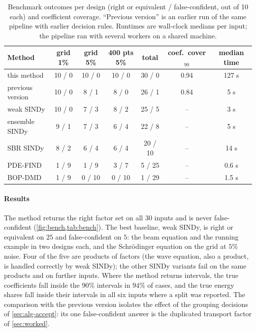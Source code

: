 \begin{table}[tbp]
\centering\small
\caption{Benchmark outcomes per design (right or equivalent / false-confident, out of 10 each) and coefficient
coverage. ``Previous version'' is an earlier run of the same pipeline with earlier decision rules. Runtimes are wall-clock medians per input; the pipeline ran
with several workers on a shared machine.}\label{tab:bench}
\begin{tabular}{@{}lcccccc@{}}
\toprule
Method & grid 1\% & grid 5\% & 400 pts 5\% & total & coef.\ cover$_{90}$ & median time\\
\midrule
this method        & 10 / 0 & 10 / 0 & 10 / 0 & 30 / 0 & 0.94 & 127 s\\
previous version   & 10 / 0 & \phantom{1}8 / 1 & \phantom{1}8 / 0 & 26 / 1 & 0.84 & 5 s\\
weak SINDy         & 10 / 0 & \phantom{1}7 / 3 & \phantom{1}8 / 2 & 25 / 5 & -- & 3 s\\
ensemble SINDy     & \phantom{1}9 / 1 & \phantom{1}7 / 3 & \phantom{1}6 / 4 & 22 / 8 & -- & 5 s\\
SBR SINDy          & \phantom{1}8 / 2 & \phantom{1}6 / 4 & \phantom{1}6 / 4 & 20 / 10 & -- & 14 s\\
PDE-FIND           & \phantom{1}1 / 9 & \phantom{1}1 / 9 & \phantom{1}3 / 7 & \phantom{1}5 / 25 & -- & 0.6 s\\
BOP-DMD            & \phantom{1}1 / 9 & \phantom{1}0 / 10 & \phantom{1}0 / 10 & \phantom{1}1 / 29 & -- & 1.5 s\\
\bottomrule
\end{tabular}
\end{table}

\paragraph{Results} The method returns the right factor set on all $30$ inputs and is never
false-confident (\cref{fig:bench,tab:bench}). The best baseline, weak SINDy, is right or equivalent on $25$
and false-confident on $5$: the beam equation and the running example in two designs each, and the
Schr\"odinger equation on the grid at $5\%$ noise. Four of the five are products of factors (the wave equation, also a
product, is handled correctly by weak SINDy); the other SINDy variants fail on the same products and on further
inputs. Where the method returns intervals, the true coefficients fall inside the $90\%$ intervals in
$94\%$ of cases, and the true energy shares fall inside their intervals in all six inputs where a split was reported. The comparison with the previous version isolates the effect of the grouping decisions of
\cref{sec:alg-accept}: its one false-confident answer is the duplicated transport factor of
\cref{sec:worked}.

